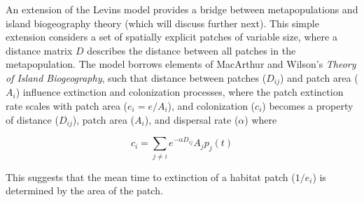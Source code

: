\documentclass[12pt]{article}
\begin{document}
An extension of the Levins model provides a bridge between metapopulations and island biogeography theory (which will discuss further next). This simple extension considers a set of spatially explicit patches of variable size, where a distance matrix $D$ describes the distance between all patches in the metapopulation. The model borrows elements of MacArthur and Wilson's \textit{Theory of Island Biogeography}, such that distance between patches ($D_{ij}$) and patch area ($A_{i}$) influence extinction and colonization processes, where the patch extinction rate scales with patch area ($e_{i} = e / A_{i}$), and colonization ($c_{i}$) becomes a property of distance ($D_{ij}$), patch area ($A_{i}$), and dispersal rate ($\alpha$) where  


\begin{equation}
c_{i} = \sum_{j \ne i}e^{-\alpha D_{ij}} A_{j}p_{j}(t)
\end{equation}


\noindent This suggests that the mean time to extinction of a habitat patch ($1 / e_{i}$) is determined by the area of the patch. 
\end{document}
